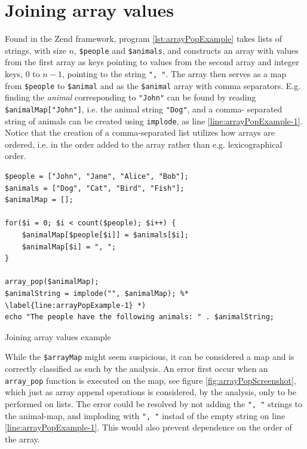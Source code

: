 \newpage
\section{Joining array values}
Found in the Zend framework, program \ref{lst:arrayPopExample} takes lists of strings, with 
size $n$, \texttt{\$people} and \texttt{\$animals}, and constructs an array with values from 
the first array as keys pointing to values from the second array and integer keys, $0$ to 
$n-1$, pointing to the string \texttt{", "}. The array then serves as a map from 
\texttt{\$people} to \texttt{\$animal} and as the \texttt{\$animal} array with comma 
separators. E.g. finding the \textit{animal} corresponding to \texttt{"John"} can be found by 
reading \texttt{\$animalMap["John"]}, i.e. the animal string \texttt{"Dog"}, and a comma-
separated string of animals can be created using \texttt{implode}, as line 
\ref{line:arrayPopExample-1}. Notice that the creation of a comma-separated list utilizes how 
arrays are ordered, i.e. in the order added to the array rather than e.g. lexicographical 
order. 

\begin{program}
\begin{lstlisting}
$people = ["John", "Jane", "Alice", "Bob"];
$animals = ["Dog", "Cat", "Bird", "Fish"];
$animalMap = [];

for($i = 0; $i < count($people); $i++) {
    $animalMap[$people[$i]] = $animals[$i];
    $animalMap[$i] = ", ";
}

array_pop($animalMap);
$animalString = implode("", $animalMap); %* \label{line:arrayPopExample-1} *)
echo "The people have the following animals: " . $animalString;
\end{lstlisting}
\caption{Joining array values example}
\label{lst:arrayPopExample}
\end{program}


While the \texttt{\$arrayMap} might seem suspicious, it can be considered a map and is 
correctly classified as such by the analysis. An error first occur when an 
\texttt{array\_pop} function is executed on the map, see figure \ref{fig:arrayPopScreenshot}, which just as 
array append operations is considered, by the analysis, only to be performed on lists. The error could be 
resolved by not adding the \texttt{", "} strings to the animal-map, and imploding with \texttt{", "} instad of the empty string on line \ref{line:arrayPopExample-1}. This would also prevent dependence on the order of the array.

